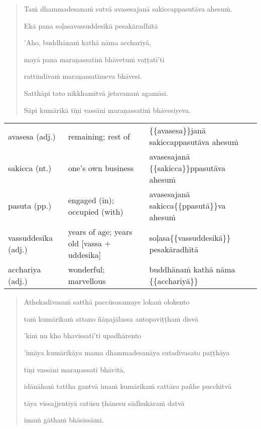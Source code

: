 \documentclass[11pt,oneside]{memoir}
\begin{document}
\clearpage

\begin{quote}
Taṁ dhammadesanaṁ sutvā avasesajanā sakiccappasutāva ahesuṁ.

Ekā pana soḷasavassuddesikā pesakāradhītā

'Aho, buddhānaṁ kathā nāma acchariyā,

mayā pana maraṇassatiṁ bhāvetuṁ vaṭṭatī'ti

rattindivaṁ maraṇassatimeva bhāvesi.

Satthāpi tato nikkhamitvā jetavanaṁ agamāsi.

Sāpi kumārikā tīṇi vassāni maraṇassatiṁ bhāvesiyeva.
\end{quote}

\begin{longtable}{L{\colOne} L{\colTwo} H}
avasesa (adj.) & remaining; rest of & \{\{avasesa\}\}janā sakiccappasutāva ahesuṁ\\[0pt]
sakicca (nt.) & one's own business & avasesajanā \{\{sakicca\}\}ppasutāva ahesuṁ\\[0pt]
pasuta (pp.) & engaged (in); occupied (with) & avasesajanā sakicca\{\{ppasutā\}\}va ahesuṁ\\[0pt]
vassuddesika (adj.) & years of age; years old [vassa + uddesika] & soḷasa\{\{vassuddesikā\}\} pesakāradhītā\\[0pt]
acchariya (adj.) & wonderful; marvellous & buddhānaṁ kathā nāma \{\{acchariyā\}\}\\[0pt]
\end{longtable}

\clearpage

\begin{quote}
Athekadivasaṁ satthā paccūsasamaye lokaṁ olokento

taṁ kumārikaṁ attano ñāṇajālassa antopaviṭṭhaṁ disvā

'kiṁ nu kho bhavissatī'ti upadhārento

'imāya kumārikāya mama dhammadesanāya sutadivasato paṭṭhāya

tīṇi vassāni maraṇassati bhāvitā,

idānāhaṁ tattha gantvā imaṁ kumārikaṁ cattāro pañhe pucchitvā

tāya vissajjentiyā catūsu ṭhānesu sādhukāraṁ datvā

imaṁ gāthaṁ bhāsissāmi.
\end{quote}
\end{document}
